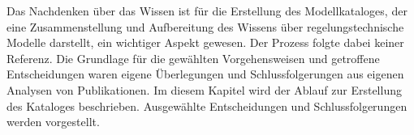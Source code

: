 
Das Nachdenken über das Wissen ist für die Erstellung des Modellkataloges, der eine Zusammenstellung und Aufbereitung des Wissens über regelungstechnische Modelle darstellt, ein wichtiger Aspekt gewesen. Der Prozess folgte dabei keiner Referenz. Die Grundlage für die gewählten Vorgehensweisen und getroffene Entscheidungen waren eigene Überlegungen und Schlussfolgerungen aus eigenen Analysen von Publikationen. Im diesem Kapitel wird der Ablauf zur Erstellung des Kataloges beschrieben. Ausgewählte Entscheidungen und Schlussfolgerungen werden vorgestellt. %

